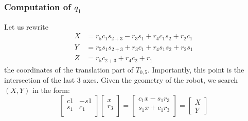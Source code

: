 \documentclass{article}
\begin{document}
\subsubsection*{Computation of $q_1$}

Let us rewrite
\begin{align*}
  X&=r_5c_1s_{2+3}-r_3s_1+r_4c_1s_2+r_2c_1\\
  Y&=r_5s_1s_{2+3}+r_3c_1+r_4s_1s_2+r_2s_1\\
  Z&=r_5c_{2+3}+r_4c_2+r_1
\end{align*}
the coordinates of the translation part of $T_{0,5}$. Importantly, this point is the intersection of the last 3 axes.
Given the geometry of the robot, we search $(X,Y)$ in the form:
\begin{equation}\label{eq:XY}
  \begin{bmatrix}
    c1 & -s1\\
    s_1 & c_1\\
  \end{bmatrix}
  \begin{bmatrix}
    x\\
    r_3\\
  \end{bmatrix}
  =
  \begin{bmatrix}
    c_1x-s_1r_3\\
    s_1x+c_1r_3\\
  \end{bmatrix}
  =
  \begin{bmatrix}
    X\\Y
  \end{bmatrix}
\end{equation}
\end{document}
